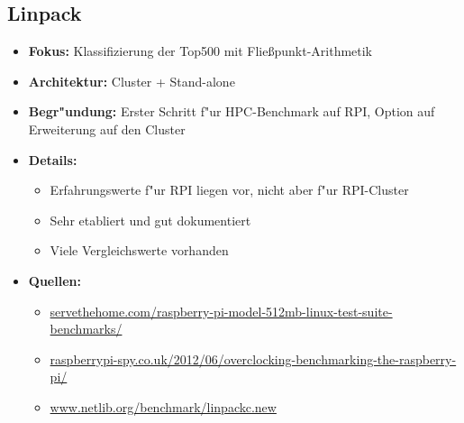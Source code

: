 \documentclass{scrartcl}
\begin{document}
\subsection{Linpack}
\begin{itemize}
	\item \textbf{Fokus:} Klassifizierung der Top500 mit Flie\ss punkt-Arithmetik
	\item \textbf{Architektur:} Cluster + Stand-alone 
	\item \textbf{Begr"undung:} Erster Schritt f"ur HPC-Benchmark auf RPI, Option auf Erweiterung auf den Cluster
	\item  \textbf{Details:}
	\begin{itemize}
		\item Erfahrungswerte f"ur RPI liegen vor, nicht aber f"ur RPI-Cluster 
		\item Sehr etabliert und gut dokumentiert
		\item Viele Vergleichswerte vorhanden 
	\end{itemize}
	\item \textbf{Quellen:} 
	\begin{itemize}
		\item \uline{servethehome.com/raspberry-pi-model-512mb-linux-test-suite-benchmarks/}
		\item \uline{raspberrypi-spy.co.uk/2012/06/overclocking-benchmarking-the-raspberry-pi/}
		\item \uline{www.netlib.org/benchmark/linpackc.new}
	\end{itemize}	  
\end{itemize}
\end{document}
